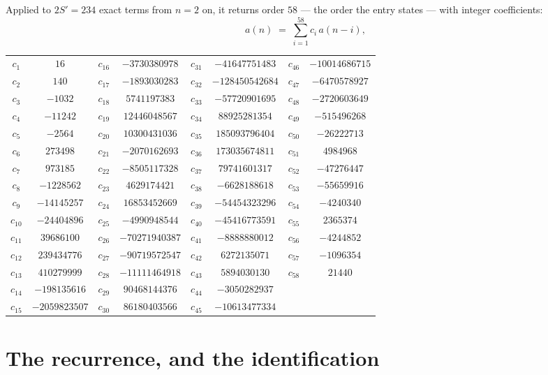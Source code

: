 \documentclass[11pt,a4paper]{article}
\theoremstyle{plain}
\theoremstyle{definition}
\begin{document}
Applied to $2S'=234$ exact terms from $n=2$ on, it returns order $58$ --- the
order the entry states --- with integer coefficients:
\[
a(n)\;=\;\sum_{i=1}^{58}c_i\,a(n-i),
\]
\begin{center}\small
\begin{tabular}{cccccccc}
$c_{1}$ & $16$ & $c_{16}$ & $-3730380978$ & $c_{31}$ & $-41647751483$ & $c_{46}$ & $-10014686715$ \\
$c_{2}$ & $140$ & $c_{17}$ & $-1893030283$ & $c_{32}$ & $-128450542684$ & $c_{47}$ & $-6470578927$ \\
$c_{3}$ & $-1032$ & $c_{18}$ & $5741197383$ & $c_{33}$ & $-57720901695$ & $c_{48}$ & $-2720603649$ \\
$c_{4}$ & $-11242$ & $c_{19}$ & $12446048567$ & $c_{34}$ & $88925281354$ & $c_{49}$ & $-515496268$ \\
$c_{5}$ & $-2564$ & $c_{20}$ & $10300431036$ & $c_{35}$ & $185093796404$ & $c_{50}$ & $-26222713$ \\
$c_{6}$ & $273498$ & $c_{21}$ & $-2070162693$ & $c_{36}$ & $173035674811$ & $c_{51}$ & $4984968$ \\
$c_{7}$ & $973185$ & $c_{22}$ & $-8505117328$ & $c_{37}$ & $79741601317$ & $c_{52}$ & $-47276447$ \\
$c_{8}$ & $-1228562$ & $c_{23}$ & $4629174421$ & $c_{38}$ & $-6628188618$ & $c_{53}$ & $-55659916$ \\
$c_{9}$ & $-14145257$ & $c_{24}$ & $16853452669$ & $c_{39}$ & $-54454323296$ & $c_{54}$ & $-4240340$ \\
$c_{10}$ & $-24404896$ & $c_{25}$ & $-4990948544$ & $c_{40}$ & $-45416773591$ & $c_{55}$ & $2365374$ \\
$c_{11}$ & $39686100$ & $c_{26}$ & $-70271940387$ & $c_{41}$ & $-8888880012$ & $c_{56}$ & $-4244852$ \\
$c_{12}$ & $239434776$ & $c_{27}$ & $-90719572547$ & $c_{42}$ & $6272135071$ & $c_{57}$ & $-1096354$ \\
$c_{13}$ & $410279999$ & $c_{28}$ & $-11111464918$ & $c_{43}$ & $5894030130$ & $c_{58}$ & $21440$ \\
$c_{14}$ & $-198135616$ & $c_{29}$ & $90468144376$ & $c_{44}$ & $-3050282937$ &  &  \\
$c_{15}$ & $-2059823507$ & $c_{30}$ & $86180403566$ & $c_{45}$ & $-10613477334$ &  &  \\
\end{tabular}
\end{center}

\section{The recurrence, and the identification}
\end{document}
